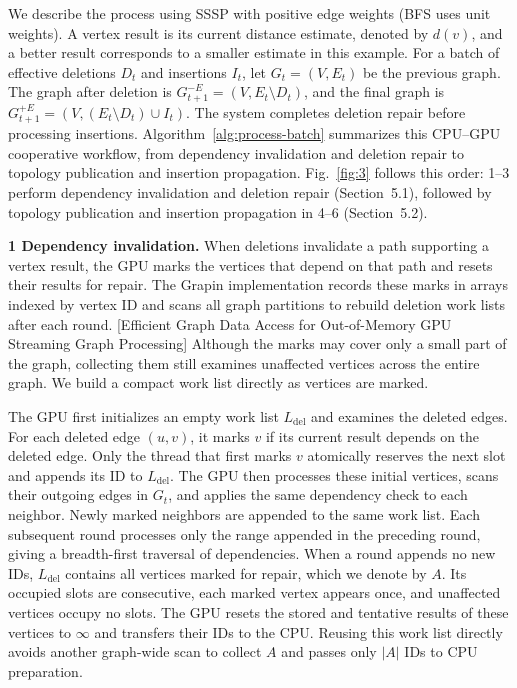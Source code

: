 We describe the process using SSSP with positive edge weights (BFS uses unit weights). A vertex result is its current distance estimate, denoted by $d(v)$, and a better result corresponds to a smaller estimate in this example. For a batch of effective deletions $D_t$ and insertions $I_t$, let $G_t=(V,E_t)$ be the previous graph. The graph after deletion is $G_{t+1}^{-E}=(V,E_t\setminus D_t)$, and the final graph is $G_{t+1}^{+E}=(V,(E_t\setminus D_t)\cup I_t)$. The system completes deletion repair before processing insertions. Algorithm~\ref{alg:process-batch} summarizes this CPU--GPU cooperative workflow, from dependency invalidation and deletion repair to topology publication and insertion propagation. Fig.~\ref{fig:3} follows this order: 1--3 perform dependency invalidation and deletion repair (Section~5.1), followed by topology publication and insertion propagation in 4--6 (Section~5.2).

\textbf{1 Dependency invalidation.} When deletions invalidate a path supporting a vertex result, the GPU marks the vertices that depend on that path and resets their results for repair. The Grapin implementation records these marks in arrays indexed by vertex ID and scans all graph partitions to rebuild deletion work lists after each round. [Efficient Graph Data Access for Out-of-Memory GPU Streaming Graph Processing] Although the marks may cover only a small part of the graph, collecting them still examines unaffected vertices across the entire graph. We build a compact work list directly as vertices are marked.

The GPU first initializes an empty work list $L_{\mathrm{del}}$ and examines the deleted edges. For each deleted edge $(u,v)$, it marks $v$ if its current result depends on the deleted edge. Only the thread that first marks $v$ atomically reserves the next slot and appends its ID to $L_{\mathrm{del}}$. The GPU then processes these initial vertices, scans their outgoing edges in $G_t$, and applies the same dependency check to each neighbor. Newly marked neighbors are appended to the same work list. Each subsequent round processes only the range appended in the preceding round, giving a breadth-first traversal of dependencies. When a round appends no new IDs, $L_{\mathrm{del}}$ contains all vertices marked for repair, which we denote by $A$. Its occupied slots are consecutive, each marked vertex appears once, and unaffected vertices occupy no slots. The GPU resets the stored and tentative results of these vertices to $\infty$ and transfers their IDs to the CPU. Reusing this work list directly avoids another graph-wide scan to collect $A$ and passes only $|A|$ IDs to CPU preparation.

